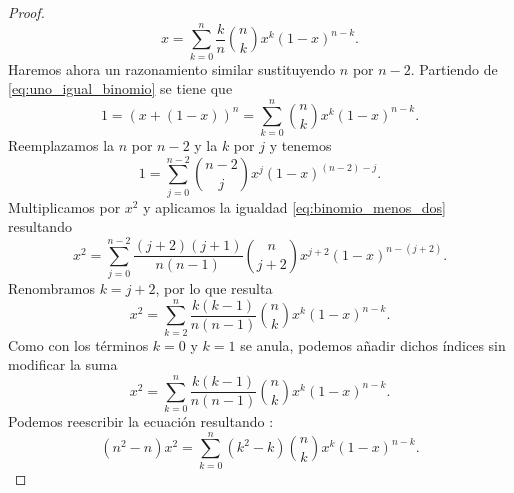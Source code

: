 \begin{proof}
    \begin{equation} \label{eq:desarrollo_binomio_uno}
        x = \sum_{k=0}^{n} \frac{k}{n} \binom{n}{k} x^{k} (1-x)^{n-k}.
    \end{equation}
    Haremos ahora un razonamiento similar sustituyendo $n$ por $n-2$.
    Partiendo de \eqref{eq:uno_igual_binomio} se tiene que 
    \begin{equation}
        1 = (x+ (1-x))^n = \sum_{k=0}^n \binom{n}{k} x^{k} (1-x)^{n-k}.
    \end{equation}
    Reemplazamos la $n$ por $n-2$ y la $k$ por $j$ y tenemos 
    \begin{equation}
        1 = \sum_{j=0}^{n-2} \binom{n-2}{j} x^{j} (1-x)^{(n-2)-j}.
    \end{equation}
    Multiplicamos por $x^2$ y aplicamos la igualdad \eqref{eq:binomio_menos_dos} resultando 
    \begin{equation}
        x^2 = \sum_{j=0}^{n-2} \frac{(j+2)(j+1)}{n(n-1)} \binom{n}{j+2} x^{j+2} (1-x)^{n-(j+2)}.
    \end{equation}
    Renombramos $k= j+2$, por lo que resulta
    \begin{equation}
        x^2 = \sum_{k=2}^{n} \frac{k(k-1)}{n(n-1)} \binom{n}{k} x^{k} (1-x)^{n-k}.
    \end{equation}
    Como con los términos $k=0$ y $k=1$ se anula, podemos añadir dichos índices sin modificar la suma 
    \begin{equation}
        x^2 = \sum_{k=0}^{n} \frac{k(k-1)}{n(n-1)} \binom{n}{k} x^{k} (1-x)^{n-k}.
    \end{equation}
    Podemos reescribir la ecuación resultando \label{eq:desarrollo_binomio_dos}: 
    \begin{equation}
      (n^2 - n)  x^2 = \sum_{k=0}^{n} (k^2 - k) \binom{n}{k} x^{k} (1-x)^{n-k}.
    \end{equation}
    
    


\end{proof}
